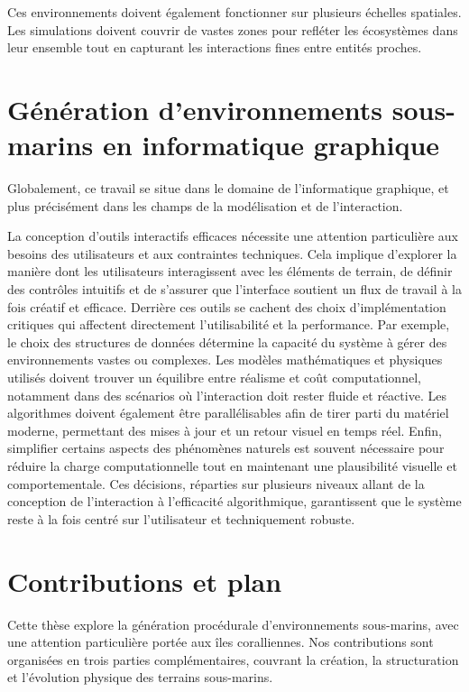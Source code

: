 Ces environnements doivent également fonctionner sur plusieurs échelles spatiales. Les simulations doivent couvrir de vastes zones pour refléter les écosystèmes dans leur ensemble tout en capturant les interactions fines entre entités proches.

\section*{Génération d'environnements sous-marins en informatique graphique}

Globalement, ce travail se situe dans le domaine de l'informatique graphique, et plus précisément dans les champs de la modélisation et de l'interaction.

La conception d'outils interactifs efficaces nécessite une attention particulière aux besoins des utilisateurs et aux contraintes techniques. Cela implique d'explorer la manière dont les utilisateurs interagissent avec les éléments de terrain, de définir des contrôles intuitifs et de s'assurer que l'interface soutient un flux de travail à la fois créatif et efficace. Derrière ces outils se cachent des choix d'implémentation critiques qui affectent directement l'utilisabilité et la performance. Par exemple, le choix des structures de données détermine la capacité du système à gérer des environnements vastes ou complexes. Les modèles mathématiques et physiques utilisés doivent trouver un équilibre entre réalisme et coût computationnel, notamment dans des scénarios où l'interaction doit rester fluide et réactive. Les algorithmes doivent également être parallélisables afin de tirer parti du matériel moderne, permettant des mises à jour et un retour visuel en temps réel. Enfin, simplifier certains aspects des phénomènes naturels est souvent nécessaire pour réduire la charge computationnelle tout en maintenant une plausibilité visuelle et comportementale. Ces décisions, réparties sur plusieurs niveaux allant de la conception de l'interaction à l'efficacité algorithmique, garantissent que le système reste à la fois centré sur l'utilisateur et techniquement robuste.

\section*{Contributions et plan}

Cette thèse explore la génération procédurale d'environnements sous-marins, avec une attention particulière portée aux îles coralliennes. Nos contributions sont organisées en trois parties complémentaires, couvrant la création, la structuration et l'évolution physique des terrains sous-marins.


